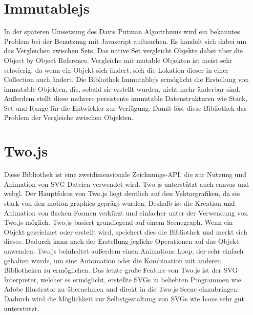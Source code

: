 \section{Immutablejs}
In der späteren Umsetzung des Davis Putman Algorithmus wird ein bekanntes Problem bei der Benutzung mit Javascript auftauchen. Es handelt sich dabei um das Vergleichen zwischen Sets. Das native Set vergleicht Objekte dabei über die Object by Object Reference. Vergleiche mit mutable Objekten ist meist sehr schwierig, da wenn ein Objekt sich ändert, sich die Lokation dieser in einer Collection auch ändert. Die Bibliothek Immutablejs ermöglicht die Erstellung von immutable Objekten, die, sobald sie erstellt wurden, nicht mehr änderbar sind. Außerdem stellt diese mehrere persistente immutable Datenstrukturen wie Stack, Set und Range für die Entwickler zur Verfügung. Damit löst diese Bibliothek das Problem der Vergleiche zwischen Objekten.

\section{Two.js}
Diese Bibliothek ist eine zweidimensionale Zeichnungs-API, die zur Nutzung und Animation von SVG Dateien verwendet wird. Two.js unterstützt auch canvas und webgl. Der Hauptfokus von Two.js liegt deutlich auf den Vektorgrafiken, da sie stark von den motion graphics geprägt wurden. Deshalb ist die Kreation und Animation von flachen Formen verkürzt und einfacher unter der Verwendung von Two.js möglich. Two.js basiert grundlegend auf einem Scenegraph. Wenn ein Objekt gezeichnet oder erstellt wird, speichert dies die Bibliothek und merkt sich dieses. Dadurch kann nach der Erstellung jegliche Operationen auf das Objekt anwenden. Two.js beinhaltet außerdem einen Animations Loop, der sehr einfach gehalten wurde, um eine Automation oder die Kombination mit anderen Bibliotheken zu ermöglichen. Das letzte große Feature von Two.js ist der SVG Interpreter, welcher es ermöglicht, erstellte SVGs in beliebten Programmen wie Adobe Illustrator zu übernehmen und direkt in die Two.js Scene einzubringen. Dadurch wird die Möglichkeit zur Selbstgestaltung von SVGs wie Icons sehr gut unterstützt.

